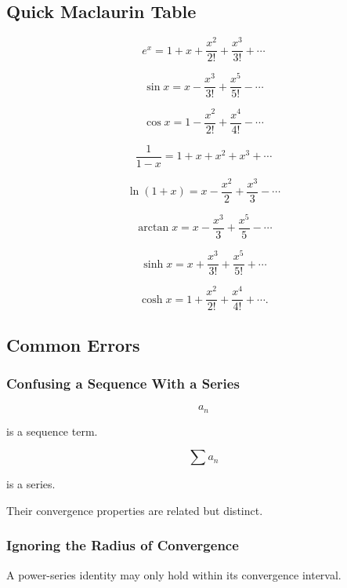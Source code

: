 \subsection{Quick Maclaurin Table}
\label{subsec:quick-maclaurin-table}

\[
\boxed{
e^x
=
1+x+\frac{x^2}{2!}
+\frac{x^3}{3!}
+\cdots
}
\]

\[
\boxed{
\sin x
=
x-\frac{x^3}{3!}
+\frac{x^5}{5!}
-\cdots
}
\]

\[
\boxed{
\cos x
=
1-\frac{x^2}{2!}
+\frac{x^4}{4!}
-\cdots
}
\]

\[
\boxed{
\frac{1}{1-x}
=
1+x+x^2+x^3+\cdots
}
\]

\[
\boxed{
\ln(1+x)
=
x-\frac{x^2}{2}
+\frac{x^3}{3}
-\cdots
}
\]

\[
\boxed{
\arctan x
=
x-\frac{x^3}{3}
+\frac{x^5}{5}
-\cdots
}
\]

\[
\boxed{
\sinh x
=
x+\frac{x^3}{3!}
+\frac{x^5}{5!}
+\cdots
}
\]

\[
\boxed{
\cosh x
=
1+\frac{x^2}{2!}
+\frac{x^4}{4!}
+\cdots.
}
\]

\subsection{Common Errors}
\label{subsec:series-expansions-common-errors}

\subsubsection{Confusing a Sequence With a Series}

\[
a_n
\]

is a sequence term.

\[
\sum a_n
\]

is a series.

Their convergence properties are related but distinct.

\subsubsection{Ignoring the Radius of Convergence}

A power-series identity may only hold within its convergence interval.

